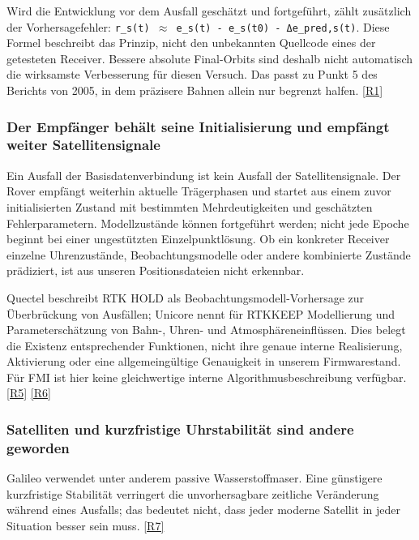 \documentclass[11pt,a4paper]{article}
\numberwithin{equation}{section}
\numberwithin{figure}{section}
\begin{document}
Wird die Entwicklung vor dem Ausfall geschätzt und fortgeführt, zählt zusätzlich der Vorhersagefehler: {\small\texttt{r\_\allowbreak{}s(t) \ensuremath{\approx} e\_\allowbreak{}s(t) - e\_\allowbreak{}s(t0) - Δe\_\allowbreak{}pred,s(t)}}. Diese Formel beschreibt das Prinzip, nicht den unbekannten Quellcode eines der getesteten Receiver. Bessere absolute Final-Orbits sind deshalb nicht automatisch die wirksamste Verbesserung für diesen Versuch. Das passt zu Punkt 5 des Berichts von 2005, in dem präzisere Bahnen allein nur begrenzt halfen. \hyperlink{ref-R1}{[R1]}

\subsubsection{Der Empfänger behält seine Initialisierung und empfängt weiter Satellitensignale}

Ein Ausfall der Basisdatenverbindung ist kein Ausfall der Satellitensignale. Der Rover empfängt weiterhin aktuelle Trägerphasen und startet aus einem zuvor initialisierten Zustand mit bestimmten Mehrdeutigkeiten und geschätzten Fehlerparametern. Modellzustände können fortgeführt werden; nicht jede Epoche beginnt bei einer ungestützten Einzelpunktlösung. Ob ein konkreter Receiver einzelne Uhrenzustände, Beobachtungsmodelle oder andere kombinierte Zustände prädiziert, ist aus unseren Positionsdateien nicht erkennbar.

Quectel beschreibt RTK HOLD als Beobachtungsmodell-Vorhersage zur Überbrückung von Ausfällen; Unicore nennt für RTKKEEP Modellierung und Parameterschätzung von Bahn-, Uhren- und Atmosphäreneinflüssen. Dies belegt die Existenz entsprechender Funktionen, nicht ihre genaue interne Realisierung, Aktivierung oder eine allgemeingültige Genauigkeit in unserem Firmwarestand. Für FMI ist hier keine gleichwertige interne Algorithmusbeschreibung verfügbar. \hyperlink{ref-R5}{[R5]} \hyperlink{ref-R6}{[R6]}

\subsubsection{Satelliten und kurzfristige Uhrstabilität sind andere geworden}

Galileo verwendet unter anderem passive Wasserstoffmaser. Eine günstigere kurzfristige Stabilität verringert die unvorhersagbare zeitliche Veränderung während eines Ausfalls; das bedeutet nicht, dass jeder moderne Satellit in jeder Situation besser sein muss. \hyperlink{ref-R7}{[R7]}
\end{document}
